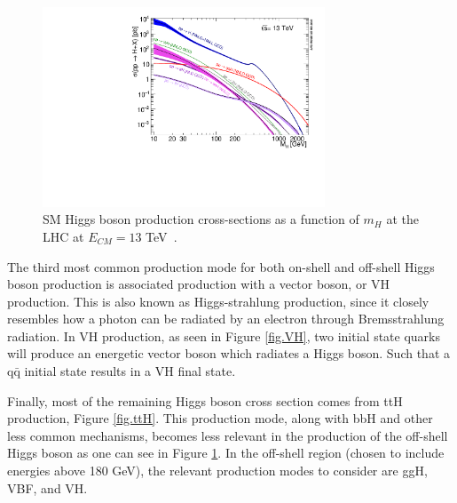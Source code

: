 \begin{figure}[!hbt]
\centering
\includegraphics[width=0.75\textwidth,clip] {figures/plotAll_13tev_BSM_sqrt.pdf}
\caption{SM Higgs boson production cross-sections as a function of $m_{H}$ at the LHC at $E_{CM}=13$ TeV~\cite{YR4}.}
\label{fig:prodModes}
\end{figure}

The third most common production mode for both on-shell and off-shell Higgs boson production is associated production with a vector boson, or VH production. This is also known as Higgs-strahlung production, since it closely resembles how a photon can be radiated by an electron through Bremsstrahlung radiation. In VH production, as seen in Figure \ref{fig.VH}, two initial state quarks will produce an energetic vector boson which radiates a Higgs boson. Such that a q$\bar{\text{q}}$ initial state results in a VH final state. 

Finally, most of the remaining Higgs boson cross section comes from ttH production, Figure \ref{fig.ttH}. This production mode, along with bbH and other less common mechanisms, becomes less relevant in the production of the off-shell Higgs boson as one can see in Figure \ref{fig:prodModes}. In the off-shell region (chosen to include energies above 180 GeV), the relevant production modes to consider are ggH, VBF, and VH. 

